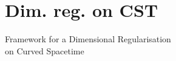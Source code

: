 \documentclass[9pt]{beamer}
\begin{document}
\section{Dim. reg. on CST}

{
\begin{frame}
\bf
\begin{exampleblock}{\vspace*{-3ex}}
\begin{center}
\Large Framework for a Dimensional Regularisation \\[10pt] on Curved Spacetime
\end{center}
\end{exampleblock}
\end{frame}
}

\end{document}
